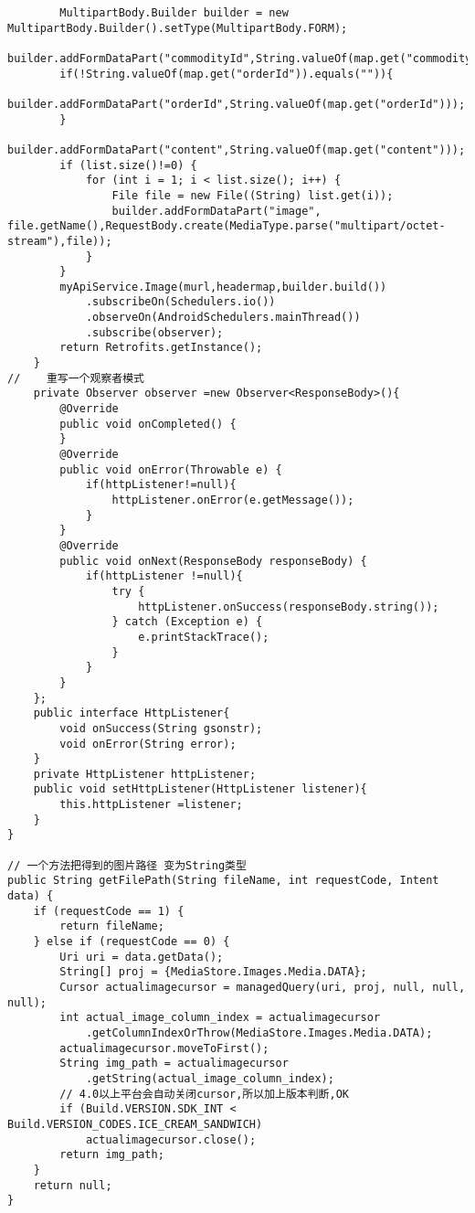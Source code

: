 \documentclass[9pt, b5paper]{article}
\begin{document}
\begin{verbatim}
        MultipartBody.Builder builder = new MultipartBody.Builder().setType(MultipartBody.FORM);
        builder.addFormDataPart("commodityId",String.valueOf(map.get("commodityId")));
        if(!String.valueOf(map.get("orderId")).equals("")){
            builder.addFormDataPart("orderId",String.valueOf(map.get("orderId")));
        }
        builder.addFormDataPart("content",String.valueOf(map.get("content")));
        if (list.size()!=0) {
            for (int i = 1; i < list.size(); i++) {
                File file = new File((String) list.get(i));
                builder.addFormDataPart("image", file.getName(),RequestBody.create(MediaType.parse("multipart/octet-stream"),file));
            }
        }
        myApiService.Image(murl,headermap,builder.build())
            .subscribeOn(Schedulers.io())
            .observeOn(AndroidSchedulers.mainThread())
            .subscribe(observer);
        return Retrofits.getInstance();
    }
//    重写一个观察者模式
    private Observer observer =new Observer<ResponseBody>(){
        @Override
        public void onCompleted() {
        }
        @Override
        public void onError(Throwable e) {
            if(httpListener!=null){
                httpListener.onError(e.getMessage());
            }
        }
        @Override
        public void onNext(ResponseBody responseBody) {
            if(httpListener !=null){
                try {
                    httpListener.onSuccess(responseBody.string());
                } catch (Exception e) {
                    e.printStackTrace();
                }
            }
        }
    };
    public interface HttpListener{
        void onSuccess(String gsonstr);
        void onError(String error);
    }
    private HttpListener httpListener;
    public void setHttpListener(HttpListener listener){
        this.httpListener =listener;
    }
}

// 一个方法把得到的图片路径 变为String类型
public String getFilePath(String fileName, int requestCode, Intent data) {
    if (requestCode == 1) {
        return fileName;
    } else if (requestCode == 0) {
        Uri uri = data.getData();
        String[] proj = {MediaStore.Images.Media.DATA};
        Cursor actualimagecursor = managedQuery(uri, proj, null, null, null);
        int actual_image_column_index = actualimagecursor
            .getColumnIndexOrThrow(MediaStore.Images.Media.DATA);
        actualimagecursor.moveToFirst();
        String img_path = actualimagecursor
            .getString(actual_image_column_index);
        // 4.0以上平台会自动关闭cursor,所以加上版本判断,OK
        if (Build.VERSION.SDK_INT < Build.VERSION_CODES.ICE_CREAM_SANDWICH)
            actualimagecursor.close();
        return img_path;
    }
    return null;
}


\end{verbatim}
\end{document}
